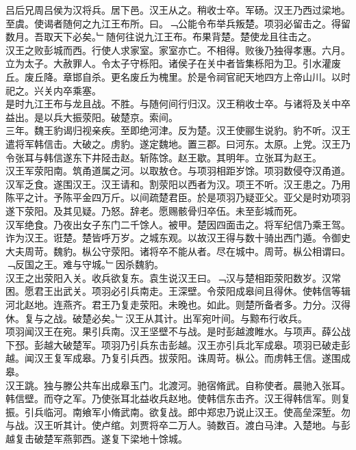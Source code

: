\documentclass{zhvt-classic}
\begin{document}
\hspace*{2em}吕后兄周吕侯为汉将兵。居下邑。汉王从之。稍收士卒。军砀。汉王乃西过梁地。至虞。使谒者随何之九江王布所。曰。﹁公能令布举兵叛楚。项羽必留击之。得留数月。吾取天下必矣。﹂随何往说九江王布。布果背楚。楚使龙且往击之。\\
\hspace*{2em}汉王之败彭城而西。行使人求家室。家室亦亡。不相得。败後乃独得孝惠。六月。立为太子。大赦罪人。令太子守栎阳。诸侯子在关中者皆集栎阳为卫。引水灌废丘。废丘降。章邯自杀。更名废丘为槐里。於是令祠官祀天地四方上帝山川。以时祀之。兴关内卒乘塞。\\
\hspace*{2em}是时九江王布与龙且战。不胜。与随何间行归汉。汉王稍收士卒。与诸将及关中卒益出。是以兵大振荥阳。破楚京。索间。\\
\hspace*{2em}三年。魏王豹谒归视亲疾。至即绝河津。反为楚。汉王使郦生说豹。豹不听。汉王遣将军韩信击。大破之。虏豹。遂定魏地。置三郡。曰河东。太原。上党。汉王乃令张耳与韩信遂东下井陉击赵。斩陈馀。赵王歇。其明年。立张耳为赵王。\\
\hspace*{2em}汉王军荥阳南。筑甬道属之河。以取敖仓。与项羽相距岁馀。项羽数侵夺汉甬道。汉军乏食。遂围汉王。汉王请和。割荥阳以西者为汉。项王不听。汉王患之。乃用陈平之计。予陈平金四万斤。以间疏楚君臣。於是项羽乃疑亚父。亚父是时劝项羽遂下荥阳。及其见疑。乃怒。辞老。愿赐骸骨归卒伍。未至彭城而死。\\
\hspace*{2em}汉军绝食。乃夜出女子东门二千馀人。被甲。楚因四面击之。将军纪信乃乘王驾。诈为汉王。诳楚。楚皆呼万岁。之城东观。以故汉王得与数十骑出西门遁。令御史大夫周苛。魏豹。枞公守荥阳。诸将卒不能从者。尽在城中。周苛。枞公相谓曰。﹁反国之王。难与守城。﹂因杀魏豹。\\
\hspace*{2em}汉王之出荥阳入关。收兵欲复东。袁生说汉王曰。﹁汉与楚相距荥阳数岁。汉常困。愿君王出武关。项羽必引兵南走。王深壁。令荥阳成皋间且得休。使韩信等辑河北赵地。连燕齐。君王乃复走荥阳。未晚也。如此。则楚所备者多。力分。汉得休。复与之战。破楚必矣。﹂汉王从其计。出军宛叶间。与黥布行收兵。\\
\hspace*{2em}项羽闻汉王在宛。果引兵南。汉王坚壁不与战。是时彭越渡睢水。与项声。薛公战下邳。彭越大破楚军。项羽乃引兵东击彭越。汉王亦引兵北军成皋。项羽已破走彭越。闻汉王复军成皋。乃复引兵西。拔荥阳。诛周苛。枞公。而虏韩王信。遂围成皋。\\
\hspace*{2em}汉王跳。独与滕公共车出成皋玉门。北渡河。驰宿脩武。自称使者。晨驰入张耳。韩信壁。而夺之军。乃使张耳北益收兵赵地。使韩信东击齐。汉王得韩信军。则复振。引兵临河。南飨军小脩武南。欲复战。郎中郑忠乃说止汉王。使高垒深堑。勿与战。汉王听其计。使卢绾。刘贾将卒二万人。骑数百。渡白马津。入楚地。与彭越复击破楚军燕郭西。遂复下梁地十馀城。\\
\end{document}
